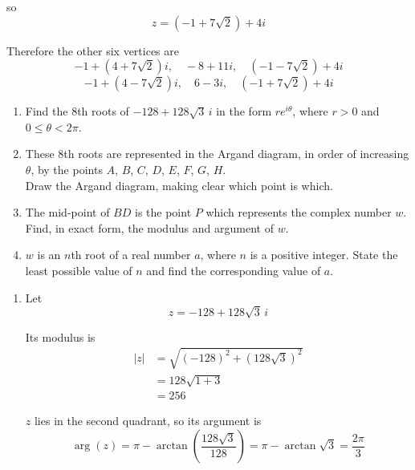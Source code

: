 \documentclass[leqno]{article}
\begin{document}
\begin{enumerate}[
  label=\textbf{\arabic*.},
  leftmargin=*,
  topsep=0pt,
  partopsep=0pt,
  parsep=0pt
]
\begin{djsSolution}
\begin{enumerate}[label=\textbf{(\alph*)}]
\begin{enumerate}[label=(\roman*)]
so
\[
z=(-1+7\sqrt2)+4i
\]

Therefore the other six vertices are
\[
-1+(4+7\sqrt2)i,\quad -8+11i,\quad (-1-7\sqrt2)+4i
\]
\[
-1+(4-7\sqrt2)i,\quad 6-3i,\quad (-1+7\sqrt2)+4i
\]
  \end{enumerate}
\end{enumerate}
\end{djsSolution}


\newpage

\questionitem

\begin{enumerate}[label=\textbf{(\roman*)}]
  \item Find the $8$th roots of $-128+128\sqrt{3}\,i$ in the form $re^{i\theta}$, where $r>0$ and $0\leq \theta<2\pi$.  \\
  \item These $8$th roots are represented in the Argand diagram, in order of increasing $\theta$, by the points $A$, $B$, $C$, $D$, $E$, $F$, $G$, $H$. \\
  Draw the Argand diagram, making clear which point is which.  \\
  \item The mid-point of $BD$ is the point $P$ which represents the complex number $w$. \\
  Find, in exact form, the modulus and argument of $w$.  \\
  \item $w$ is an $n$th root of a real number $a$, where $n$ is a positive integer. State the least possible value of $n$ and find the corresponding value of $a$.  \\
\end{enumerate}

\vspace*{10pt}

\begin{djsSolution}
\begin{enumerate}[label=\textbf{(\roman*)}]
\item Let
\[
z=-128+128\sqrt{3}\,i
\]

Its modulus is
\begin{align*}
|z|
&=\sqrt{(-128)^2+(128\sqrt{3})^2} \\
&=128\sqrt{1+3} \\
&=256
\end{align*}

\(z\) lies in the second quadrant, so its argument is
\[
\arg(z)=\pi-\arctan\left(\frac{128\sqrt{3}}{128}\right)=\pi-\arctan\sqrt{3}=\frac{2\pi}{3}
\]


\end{enumerate}
\end{djsSolution}
\end{enumerate}
\end{document}
